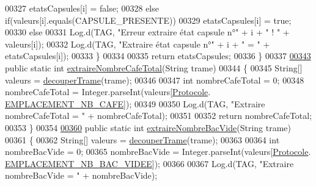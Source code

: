 \begin{DoxyCode}
00327                 etatsCapsules[i] = \textcolor{keyword}{false};
00328             \textcolor{keywordflow}{else} \textcolor{keywordflow}{if}(valeurs[i].equals(CAPSULE\_PRESENTE))
00329                 etatsCapsules[i] = \textcolor{keyword}{true};
00330             \textcolor{keywordflow}{else}
00331                 Log.d(TAG, \textcolor{stringliteral}{"Erreur extraire état capsule n°"} + i + \textcolor{stringliteral}{" ! "} + valeurs[i]);
00332             Log.d(TAG, \textcolor{stringliteral}{"Extraire état capsule n°"} + i + \textcolor{stringliteral}{" = "} + etatsCapsules[i]);
00333         \}
00334 
00335         \textcolor{keywordflow}{return} etatsCapsules;
00336     \}
00337 
\hyperlink{classcom_1_1example_1_1ekawa_1_1_protocole_ad76b79c64aaa9abed9a1219f3f28cb9a}{00343}     \textcolor{keyword}{public} \textcolor{keyword}{static} \textcolor{keywordtype}{int} \hyperlink{classcom_1_1example_1_1ekawa_1_1_protocole_ad76b79c64aaa9abed9a1219f3f28cb9a}{extraireNombreCafeTotal}(String trame)
00344     \{
00345         String[] valeurs = \hyperlink{classcom_1_1example_1_1ekawa_1_1_protocole_a23c261e4ab5ad3c2ac60187f04ae40ea}{decouperTrame}(trame);
00346 
00347         \textcolor{keywordtype}{int} nombreCafeTotal = 0;
00348         nombreCafeTotal = Integer.parseInt(valeurs[\hyperlink{classcom_1_1example_1_1ekawa_1_1_protocole}{Protocole}.
      \hyperlink{classcom_1_1example_1_1ekawa_1_1_protocole_a328dc7d5ae0030abea78746a469d0301}{EMPLACEMENT\_NB\_CAFE}]);
00349 
00350         Log.d(TAG, \textcolor{stringliteral}{"Extraire nombreCafeTotal = "} + nombreCafeTotal);
00351 
00352         \textcolor{keywordflow}{return} nombreCafeTotal;
00353     \}
00354 
\hyperlink{classcom_1_1example_1_1ekawa_1_1_protocole_a7cdbcbd7aa67f4b0cebb963725b0c67e}{00360}     \textcolor{keyword}{public} \textcolor{keyword}{static} \textcolor{keywordtype}{int} \hyperlink{classcom_1_1example_1_1ekawa_1_1_protocole_a7cdbcbd7aa67f4b0cebb963725b0c67e}{extraireNombreBacVide}(String trame)
00361     \{
00362         String[] valeurs = \hyperlink{classcom_1_1example_1_1ekawa_1_1_protocole_a23c261e4ab5ad3c2ac60187f04ae40ea}{decouperTrame}(trame);
00363 
00364         \textcolor{keywordtype}{int} nombreBacVide = 0;
00365         nombreBacVide = Integer.parseInt(valeurs[\hyperlink{classcom_1_1example_1_1ekawa_1_1_protocole}{Protocole}.
      \hyperlink{classcom_1_1example_1_1ekawa_1_1_protocole_ac637e46d16d675adb3c0729055d259cd}{EMPLACEMENT\_NB\_BAC\_VIDEE}]);
00366 
00367         Log.d(TAG, \textcolor{stringliteral}{"Extraire nombreBacVide = "} + nombreBacVide);

\end{DoxyCode}

